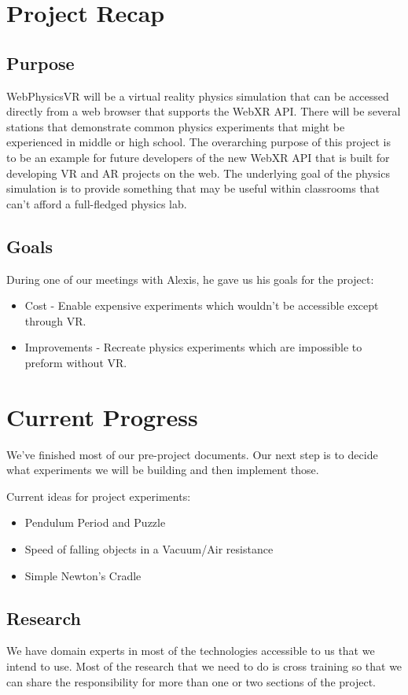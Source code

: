 \documentclass[onecolumn, draftclsnofoot,10pt, compsoc]{IEEEtran}
\begin{document}
\section{Project Recap}
\subsection{Purpose}
WebPhysicsVR will be a virtual reality physics simulation that can be accessed directly from a web browser that supports the WebXR API. There will be several stations that demonstrate common physics experiments that might be experienced in middle or high school. The overarching purpose of this project is to be an example for future developers of the new WebXR API that is built for developing VR and AR projects on the web. The underlying goal of the physics simulation is to provide something that may be useful within classrooms that can't afford a full-fledged physics lab.

\subsection{Goals}
During one of our meetings with Alexis, he gave us his goals for the project:
\begin{itemize}
\item Cost - Enable expensive experiments which wouldn't be accessible except through VR.
\item Improvements - Recreate physics experiments which are impossible to preform without VR.
\end{itemize}

\section{Current Progress}
We've finished most of our pre-project documents.  Our next step is to decide what experiments we will be building and then implement those. 

Current ideas for project experiments:
\begin{itemize}
    \item Pendulum Period and Puzzle
    \item Speed of falling objects in a Vacuum/Air resistance
    \item Simple Newton's Cradle
\end{itemize}

\subsection{Research}
We have domain experts in most of the technologies accessible to us that we intend to use.  Most of the research that we need to do is cross training so that we can share the responsibility for more than one or two sections of the project.
\end{document}
